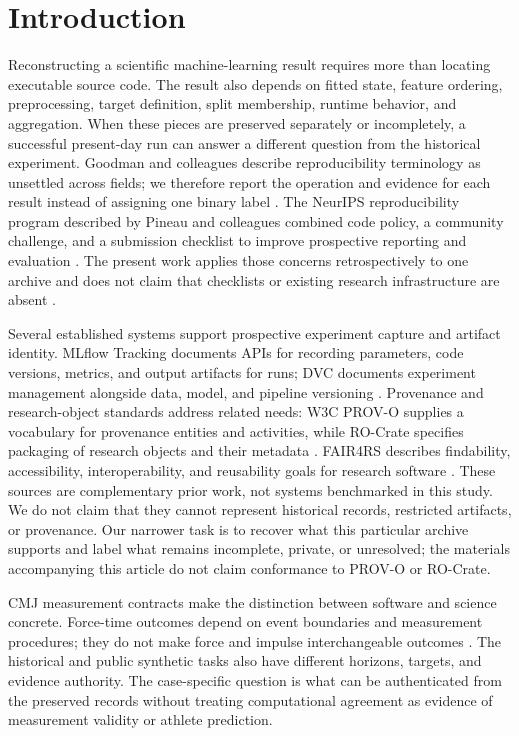 \documentclass[12pt,a4paper]{article}
\begin{document}
\section{Introduction}

Reconstructing a scientific machine-learning result requires more than locating executable source code. The result also depends on fitted state, feature ordering, preprocessing, target definition, split membership, runtime behavior, and aggregation. When these pieces are preserved separately or incompletely, a successful present-day run can answer a different question from the historical experiment. Goodman and colleagues describe reproducibility terminology as unsettled across fields; we therefore report the operation and evidence for each result instead of assigning one binary label \cite{R15}. The NeurIPS reproducibility program described by Pineau and colleagues combined code policy, a community challenge, and a submission checklist to improve prospective reporting and evaluation \cite{R9}. The present work applies those concerns retrospectively to one archive and does not claim that checklists or existing research infrastructure are absent \cite{R1}.

Several established systems support prospective experiment capture and artifact identity. MLflow Tracking documents APIs for recording parameters, code versions, metrics, and output artifacts for runs; DVC documents experiment management alongside data, model, and pipeline versioning \cite{R19,R20}. Provenance and research-object standards address related needs: W3C PROV-O supplies a vocabulary for provenance entities and activities, while RO-Crate specifies packaging of research objects and their metadata \cite{R17,R18}. FAIR4RS describes findability, accessibility, interoperability, and reusability goals for research software \cite{R7}. These sources are complementary prior work, not systems benchmarked in this study. We do not claim that they cannot represent historical records, restricted artifacts, or provenance. Our narrower task is to recover what this particular archive supports and label what remains incomplete, private, or unresolved; the materials accompanying this article do not claim conformance to PROV-O or RO-Crate.

CMJ measurement contracts make the distinction between software and science concrete. Force-time outcomes depend on event boundaries and measurement procedures; they do not make force and impulse interchangeable outcomes \cite{R3,R4}. The historical and public synthetic tasks also have different horizons, targets, and evidence authority. The case-specific question is what can be authenticated from the preserved records without treating computational agreement as evidence of measurement validity or athlete prediction.
\end{document}
